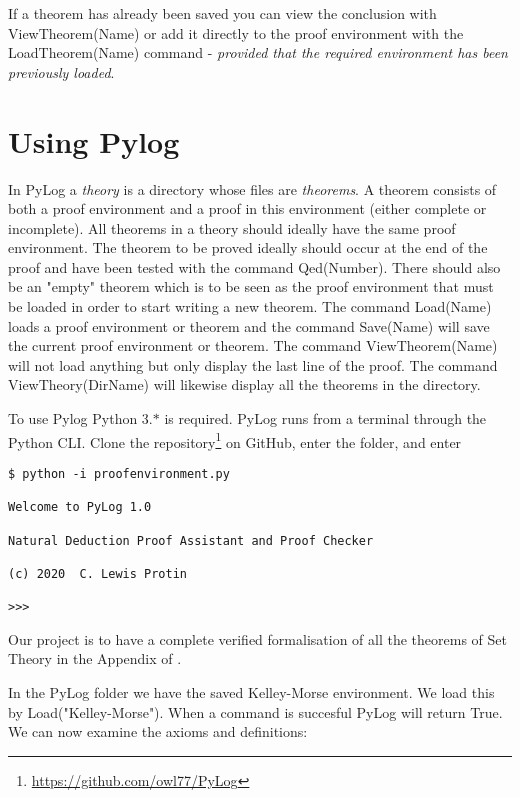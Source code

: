 \documentclass[12pt,leqno]{article}
\numberwithin{equation}{section}
\begin{document}
If a theorem has already been saved you can view the conclusion with ViewTheorem(Name) or add it directly to the proof environment with the LoadTheorem(Name) command - \emph{provided that the required environment has been previously loaded}.

\section*{Using Pylog}

In PyLog a \emph{theory} is a directory whose files are \emph{theorems}. A theorem consists of both a proof environment and a proof in this environment (either complete or incomplete).  All theorems in a theory should ideally have the same proof environment. The theorem to be proved ideally should occur at the end of the proof and have been tested with the command Qed(Number).
There should also be an "empty" theorem which is to be seen as the proof environment that must be loaded in order to start writing a new theorem. The command Load(Name) loads a proof environment or theorem and the command Save(Name) will save the current proof environment or theorem. The command ViewTheorem(Name) will not load anything but only display the last line of the proof. The command ViewTheory(DirName) will likewise display all the theorems in the directory.

To use Pylog Python 3.$*$ is required. PyLog runs from a terminal through the Python CLI.
  Clone the repository\footnote{\url{https://github.com/owl77/PyLog}} on GitHub, enter the folder, and enter
    \begin{verbatim}
$ python -i proofenvironment.py

Welcome to PyLog 1.0

Natural Deduction Proof Assistant and Proof Checker

(c) 2020  C. Lewis Protin

>>> 
 \end{verbatim}	


Our project is to have a complete verified formalisation of all the theorems of Set Theory in the Appendix of \cite{kel}.


In the PyLog folder we have the saved Kelley-Morse environment. We load this by Load("Kelley-Morse"). When a command is succesful PyLog will return True. We can now examine the axioms and definitions:
\end{document}
